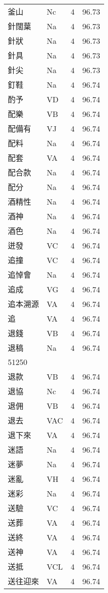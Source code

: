 \documentclass[twocolumn]{book}
\begin{document}
\begin{supertabular}{llrr}
釜山 & Nc & 4 &  96.73\\
針闊葉 & Na & 4 &  96.73\\
針狀 & Na & 4 &  96.73\\
針具 & Na & 4 &  96.73\\
針尖 & Na & 4 &  96.73\\
釘鞋 & Na & 4 &  96.74\\
酌予 & VD & 4 &  96.74\\
配樂 & VB & 4 &  96.74\\
配備有 & VJ & 4 &  96.74\\
配料 & Na & 4 &  96.74\\
配套 & VA & 4 &  96.74\\
配合款 & Na & 4 &  96.74\\
配分 & Na & 4 &  96.74\\
酒精性 & Na & 4 &  96.74\\
酒神 & Na & 4 &  96.74\\
酒色 & Na & 4 &  96.74\\
迸發 & VC & 4 &  96.74\\
追撞 & VC & 4 &  96.74\\
追悼會 & Na & 4 &  96.74\\
追成 & VG & 4 &  96.74\\
追本溯源 & VA & 4 &  96.74\\
追 & VA & 4 &  96.74\\
退錢 & VB & 4 &  96.74\\
退稿 & Na & 4 &  96.74\\
51250\\
退款 & VB & 4 &  96.74\\
退協 & Nc & 4 &  96.74\\
退佣 & VB & 4 &  96.74\\
退去 & VAC & 4 &  96.74\\
退下來 & VA & 4 &  96.74\\
迷語 & Na & 4 &  96.74\\
迷夢 & Na & 4 &  96.74\\
迷亂 & VH & 4 &  96.74\\
迷彩 & Na & 4 &  96.74\\
送驗 & VC & 4 &  96.74\\
送葬 & VA & 4 &  96.74\\
送終 & VA & 4 &  96.74\\
送神 & VA & 4 &  96.74\\
送抵 & VCL & 4 &  96.74\\
送往迎來 & VA & 4 &  96.74\\

\end{supertabular}
\end{document}
